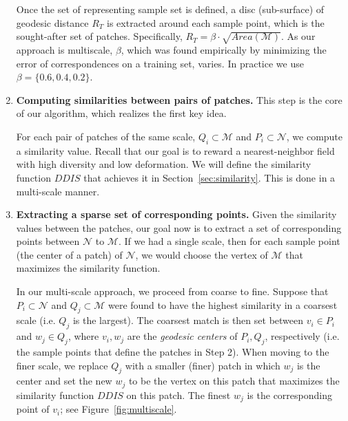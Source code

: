 \documentclass[10pt,twocolumn,letterpaper]{article}
\newcommand{\colornote}[3]{{\color{#1}\bf{#2: #3}\normalfont}}
\newcommand{\colornote}[3]{}
\newcommand {\nadav}[1]{\colornote{red}{NA}{#1}}
\begin{document}
\begin{enumerate}
    Once the set of representing sample set is defined, a disc (sub-surface) of geodesic distance $R_T$ is extracted around each sample point, which is the sought-after set of patches.
    Specifically, $R_T=\beta\cdot \sqrt{Area(\mathcal{M})}$.
    As our approach is multiscale, $\beta$, which was found empirically by minimizing the error of correspondences on a training set, varies. 
    In practice we use $\beta=\{0.6,0.4,0.2\}$.
 
    
    \item
    {\bf Computing similarities between pairs of patches.} 
    This step is the core of our algorithm, which realizes the first key idea.
 
    For each pair of patches of the same scale, $Q_i \subset \mathcal{M}$ and $P_i \subset \mathcal{N}$, we compute a similarity value.
    Recall that our goal is to reward a nearest-neighbor field with high diversity and low deformation. 
    We will define the similarity function $DDIS$ that achieves it  in Section~\ref{sec:similarity}.
    This is done in a multi-scale manner.

    
   \item{\bf Extracting a sparse set of corresponding points.}
    Given the similarity values between the patches, our goal now is to extract a set of corresponding points between  $\mathcal{N}$ to $\mathcal{M}$.
    If we had a single scale, then for each sample point (the center of a patch) of $\mathcal{N}$, we would choose the vertex of $\mathcal{M}$ that maximizes the similarity function.

    In our multi-scale approach, we proceed from coarse to fine.
    Suppose that $P_i \subset \mathcal{N}$ and $Q_j\subset \mathcal{M}$ were found to have the highest similarity in a coarsest scale (i.e. $Q_j$ is the largest).
    The coarsest match is then set between $v_i \in P_i$ and $w_j \in Q_j$, where $v_i, w_j$ are the {\em geodesic centers} of  $P_i, Q_j$, respectively (i.e. the sample points that define the patches in Step 2).
    When moving to the finer scale, we replace  $Q_j$ with a smaller (finer) patch in which $w_j$ is the center and set the new $w_j$ to be the vertex on this patch that  maximizes the similarity function $DDIS$ on this patch.
    The finest $w_j$ is the corresponding point of $v_i$; see Figure~\ref{fig:multiscale}.
    

\end{enumerate}
\end{document}
